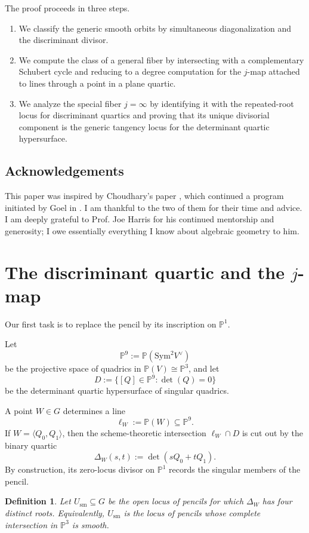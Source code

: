 \documentclass[11pt]{article}
\newtheorem{definition}[theorem]{Definition}
\newcommand{\Pj}{\mathbb P}
\newcommand{\Sym}{\mathrm{Sym}}
\begin{document}
The proof proceeds in three steps.
\begin{enumerate}[label=\arabic*.]
    \item We classify the generic smooth orbits by simultaneous diagonalization and the discriminant divisor.
    \item We compute the class of a general fiber by intersecting with a complementary Schubert cycle and reducing to a degree computation for the $j$-map attached to lines through a point in a plane quartic.
    \item We analyze the special fiber $j=\infty$ by identifying it with the repeated-root locus for discriminant quartics and proving that its unique divisorial component is the generic tangency locus for the determinant quartic hypersurface.
\end{enumerate}

\subsection*{Acknowledgements}
This paper was inspired by Choudhary's paper \cite{Choudhary}, which continued a program initiated by Goel in \cite{Goel}. I am thankful to the two of them for their time and advice. I am deeply grateful to Prof. Joe Harris for his continued mentorship and generosity; I owe essentially everything I know about algebraic geometry to him. 

\section{The discriminant quartic and the \texorpdfstring{$j$}{j}-map}
Our first task is to replace the pencil by its inscription on $\mathbb{P}^1$.

Let
\[
\Pj^9 := \Pj(\Sym^2 V^\vee)
\]
be the projective space of quadrics in $\Pj(V)\cong \Pj^3$, and let
\[
D:=\{[Q]\in \Pj^9 : \det(Q)=0\}
\]
be the determinant quartic hypersurface of singular quadrics.

A point $W\in G$ determines a line
\[
\ell_W:=\Pj(W)\subseteq \Pj^9.
\]
If $W=\langle Q_0,Q_1\rangle$, then the scheme-theoretic intersection $\ell_W\cap D$ is cut out by the binary quartic
\[
\Delta_W(s,t):=\det(sQ_0+tQ_1).
\]
By construction, its zero-locus divisor on $\Pj^1$ records the singular members of the pencil.


\begin{definition}
Let $U_{\mathrm{sm}}\subseteq G$ be the open locus of pencils for which $\Delta_W$ has four distinct roots. Equivalently, $U_{\mathrm{sm}}$ is the locus of pencils whose complete intersection in $\Pj^3$ is smooth.
\end{definition}
\end{document}
